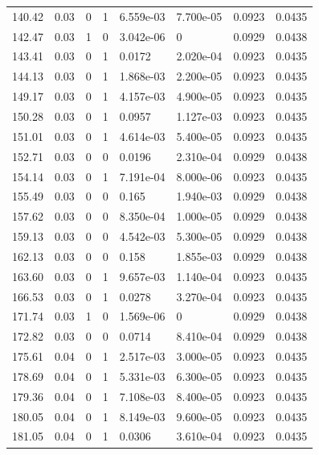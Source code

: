 \documentclass[preview]{standalone}
\begin{document}
{{{\begin{tabular}{L{1.2cm}C{1.2cm} C{0.3cm}C{0.5cm} C{1.4cm}C{1.4cm} C{1.4cm}C{1.4cm}}
  140.42  &  0.03  & 0     &  1 &  6.559e-03  & 7.700e-05  & 0.0923 &  0.0435   \\ 
  142.47  &  0.03  & 1     &  0 &  3.042e-06  & 0  & 0.0929 &  0.0438   \\ 
  143.41  &  0.03  & 0     &  1 &  0.0172  & 2.020e-04  & 0.0923 &  0.0435   \\ 
  144.13  &  0.03  & 0     &  1 &  1.868e-03  & 2.200e-05  & 0.0923 &  0.0435   \\ 
  149.17  &  0.03  & 0     &  1 &  4.157e-03  & 4.900e-05  & 0.0923 &  0.0435   \\ 
  150.28  &  0.03  & 0     &  1 &  0.0957  & 1.127e-03  & 0.0923 &  0.0435   \\ 
  151.01  &  0.03  & 0     &  1 &  4.614e-03  & 5.400e-05  & 0.0923 &  0.0435   \\ 
  152.71  &  0.03  & 0     &  0 &  0.0196  & 2.310e-04  & 0.0929 &  0.0438   \\ 
  154.14  &  0.03  & 0     &  1 &  7.191e-04  & 8.000e-06  & 0.0923 &  0.0435   \\ 
  155.49  &  0.03  & 0     &  0 &  0.165  & 1.940e-03  & 0.0929 &  0.0438   \\ 
  157.62  &  0.03  & 0     &  0 &  8.350e-04  & 1.000e-05  & 0.0929 &  0.0438   \\ 
  159.13  &  0.03  & 0     &  0 &  4.542e-03  & 5.300e-05  & 0.0929 &  0.0438   \\ 
  162.13  &  0.03  & 0     &  0 &  0.158  & 1.855e-03  & 0.0929 &  0.0438   \\ 
  163.60  &  0.03  & 0     &  1 &  9.657e-03  & 1.140e-04  & 0.0923 &  0.0435   \\ 
  166.53  &  0.03  & 0     &  1 &  0.0278  & 3.270e-04  & 0.0923 &  0.0435   \\ 
  171.74  &  0.03  & 1     &  0 &  1.569e-06  & 0  & 0.0929 &  0.0438   \\ 
  172.82  &  0.03  & 0     &  0 &  0.0714  & 8.410e-04  & 0.0929 &  0.0438   \\ 
  175.61  &  0.04  & 0     &  1 &  2.517e-03  & 3.000e-05  & 0.0923 &  0.0435   \\ 
  178.69  &  0.04  & 0     &  1 &  5.331e-03  & 6.300e-05  & 0.0923 &  0.0435   \\ 
  179.36  &  0.04  & 0     &  1 &  7.108e-03  & 8.400e-05  & 0.0923 &  0.0435   \\ 
  180.05  &  0.04  & 0     &  1 &  8.149e-03  & 9.600e-05  & 0.0923 &  0.0435   \\ 
  181.05  &  0.04  & 0     &  1 &  0.0306  & 3.610e-04  & 0.0923 &  0.0435   \\ 

\end{tabular}}}}
\end{document}
